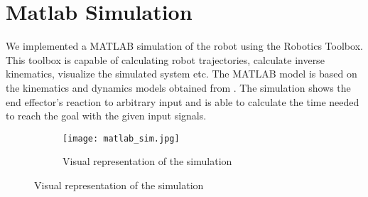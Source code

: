 \chapter{Matlab Simulation}

We implemented a MATLAB simulation of the robot using the Robotics Toolbox. This toolbox is capable of calculating robot trajectories, calculate inverse kinematics, visualize the simulated system etc. The MATLAB model is based on the kinematics and dynamics models obtained from 
. The simulation shows the end effector's reaction to arbitrary input and is able to calculate the time needed to reach the goal with the given input signals.

\begin{figure}[H]
	\centering
	\begin{subfigure}{.32\textwidth}
		\centering
		\texttt{[image: matlab\_sim.jpg]}
		\caption{Visual representation of the simulation \vspace{8.5mm}   }
		\label{fig:matlab_sim}
	\end{subfigure}
\end{figure}


